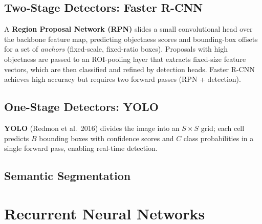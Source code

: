 \documentclass[oneside]{book}
\begin{document}

\section{Two-Stage Detectors: Faster R-CNN}

A \textbf{Region Proposal Network (RPN)} slides a small convolutional head
over the backbone feature map, predicting objectness scores and bounding-box
offsets for a set of \emph{anchors} (fixed-scale, fixed-ratio boxes).
Proposals with high objectness are passed to an ROI-pooling layer that
extracts fixed-size feature vectors, which are then classified and refined
by detection heads.  Faster R-CNN achieves high accuracy but requires two
forward passes (RPN + detection).

\section{One-Stage Detectors: YOLO}

\textbf{YOLO} (Redmon et al.\ 2016) divides the image into an $S \times S$
grid; each cell predicts $B$ bounding boxes with confidence scores and $C$
class probabilities in a single forward pass, enabling real-time detection.

\section{Semantic Segmentation}


\chapter{Recurrent Neural Networks}
\end{document}
